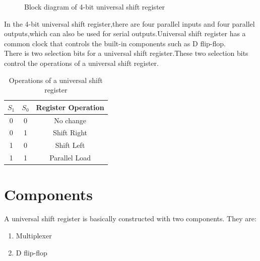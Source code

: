 \documentclass{article}
\begin{document}
\begin{flushleft}
\begin{figure}[!h]
\begin{tikzpicture}[x=0.75pt,y=0.75pt,yscale=-1,xscale=1]
\end{tikzpicture}
\label{fig:blockdiagram}
\caption{Block diagram of 4-bit universal shift register}
\end{figure}
In the 4-bit universal shift register,there are four parallel inputs and four parallel outputs,which can also be used for serial outputs.Universal shift register has a common clock that controls the built-in components such as D flip-flop.\\
There is two selection bits for a universal shift register.These two selection bits control the operations of a universal shift register.
\begin{table}[!h]
    \centering
    \begin{tabular}{|c|c|c|}
        \hline
         $S_1$ & $S_0$ & Register Operation\\ 
        \hline 
        0 & 0 & No change  \\
        \hline 
        0 & 1 & Shift Right  \\
        \hline 
        1 & 0 & Shift Left    \\
        \hline 
        1 & 1 & Parallel Load   \\
        \hline 
    \end{tabular}
    \caption{Operations of a universal shift register}
    \label{tab:selection}
\end{table}

\section{Components}
A universal shift register is basically constructed with two components. They are:
\begin{enumerate}
\item Multiplexer
\item D flip-flop
\end{enumerate}


\end{flushleft}
\end{document}
